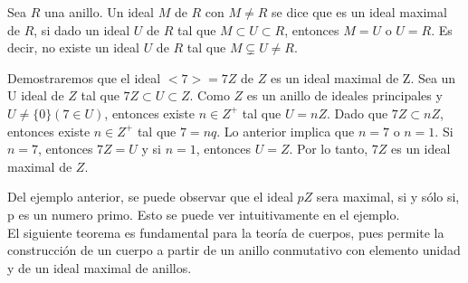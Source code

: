 \begin{defi}
Sea $R$ una anillo. Un ideal $M$ de $R$ con $M\neq R$ se dice que es un ideal maximal de $R$, si dado un ideal $U$ de $R$ tal que $M\subset U \subset R$, entonces $M=U$ o $U=R$. Es decir, no existe un ideal $U$ de $R$ tal que $M\subsetneq U \neq R$.
\end{defi}
\begin{ejemplo}
Demostraremos que el ideal $<7>=7Z$ de $Z$ es un ideal maximal de Z.
Sea un U ideal de $Z$ tal que $7Z\subset U \subset Z$. Como $Z$ es un anillo de ideales principales y $U\neq \lbrace 0 \rbrace (7\in U)$, entonces existe $n\in Z^{+}$ tal que $U=nZ$. Dado que $7Z\subset  nZ$, entonces existe $n\in Z^{+}$ tal que $7=nq$. Lo anterior implica que $n=7$ o $n=1$. Si $n=7$, entonces $7Z=U$ y si $n=1$, entonces $U=Z$. Por lo tanto, $7Z$ es un ideal maximal de $Z$.
\end{ejemplo}
Del ejemplo anterior, se puede observar que el ideal $pZ$ sera maximal, si y sólo si, p es un numero primo. Esto se puede ver intuitivamente en el ejemplo.\\
El siguiente teorema es fundamental para la teoría de cuerpos, pues permite la construcción de un cuerpo a partir de un anillo conmutativo con elemento unidad y de un ideal maximal de anillos.
